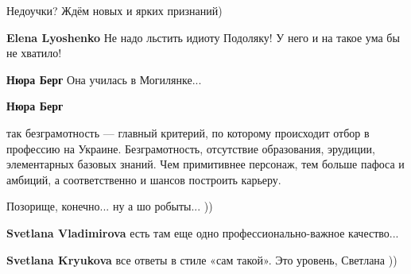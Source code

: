 \begin{itemize}
\begin{itemize}
 
Недоучки? Ждём новых и ярких признаний)

 
\textbf{Elena Lyoshenko} Не надо льстить идиоту Подоляку! У него и на такое ума бы не хватило!

 
\textbf{Нюра Берг} Она училась в Могилянке...

 
\textbf{Нюра Берг} 

так безграмотность — главный критерий, по которому происходит отбор в профессию
на Украине. Безграмотность, отсутствие образования, эрудиции, элементарных
базовых знаний. Чем примитивнее персонаж, тем больше пафоса и амбиций, а
соответственно и шансов построить карьеру.

Позорище, конечно... ну а шо робыты... ))

 

\textbf{Svetlana Vladimirova} есть там еще одно профессионально-важное качество...

 
\textbf{Svetlana Kryukova} все ответы в стиле «сам такой». Это уровень, Светлана ))


\end{itemize}
\end{itemize}
